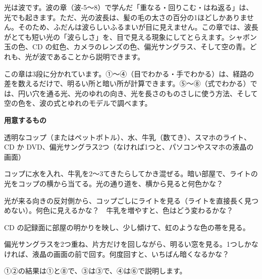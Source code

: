 \noindent 光は波です。波の章（波-5〜8）で学んだ「重なる・回りこむ・はね返る」は、光でも起きます。ただ、光の波長は、髪の毛の太さの百分の1ほどしかありません。そのため、ふだんは波らしいふるまいが目に見えません。この章では、波長がとても短い光の「波らしさ」を、目で見える現象にしてとらえます。シャボン玉の色、CD の虹色、カメラのレンズの色、偏光サングラス、そして空の青。どれも、光が波であることから説明できます。

\noindent この章は3段に分かれています。①〜④（目でわかる・手でわかる）は、経路の差を数えるだけで、明るい所と暗い所が計算できます。⑤〜⑧（式でわかる）では、円い穴を通る光、光のゆれの向き、光を長さのものさしに使う方法、そして空の色を、波の式とゆれのモデルで調べます。

\begin{yattemiyou}
\textbf{用意するもの}\par
透明なコップ（またはペットボトル）、水、牛乳（数てき）、スマホのライト、CD か DVD、偏光サングラス2つ（なければ1つと、パソコンやスマホの液晶の画面）
\begin{enumerate}[label={\bkcircled[bkGreen]{\arabic*}}, leftmargin=2.4\zw, itemsep=1pt, topsep=2pt]
\item コップに水を入れ、牛乳を2〜3てきたらしてかき混ぜる。暗い部屋で、ライトの光をコップの横から当てる。光の通り道を、横から見ると何色かな？
\item 光が来る向きの反対側から、コップごしにライトを見る（ライトを直接長く見つめない）。何色に見えるかな？　牛乳を増やすと、色はどう変わるかな？
\item CD の記録面に部屋の明かりを映し、少し傾けて、虹のような色の帯を見る。
\item 偏光サングラスを2つ重ね、片方だけを回しながら、明るい窓を見る。1つしかなければ、液晶の画面の前で回す。何度回すと、いちばん暗くなるかな？
\end{enumerate}
\end{yattemiyou}

\noindent ①②の結果は①と⑧で、③は③で、④は⑥で説明します。

\begin{omoidasou}
\end{omoidasou}


